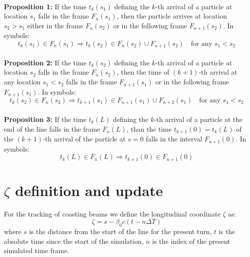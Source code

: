 ~\\
\textbf{Proposition 1:} If the time $t_k(s_1)$ defining the $k$-th arrival of a particle at location $s_1$ falls in the frame $F_n(s_1)$, then the particle arrives at location $s_2 > s_1$ either in the frame $F_n(s_2)$ or in the following frame $F_{n+1}(s_2)$. In symbols:
\begin{equation}
t_k(s_1) \in F_n(s_1) \Rightarrow t_k(s_2) \in F_n(s_2) \cup  F_{n+1}(s_2) \quad \text{for any } s_1 < s_2 
\end{equation}
~\\
\textbf{Proposition 2:} If the time $t_k(s_2)$ defining the $k$-th arrival of a particle at location $s_2$ falls in the frame $F_n(s_2)$, then the time of $(k+1)$-th arrival at any location $s_1 < s_2$ falls in the frame $F_{n+1}(s_1)$ or in the following frame $F_{n+1}(s_1)$. In symbols:
\begin{equation}
t_k(s_2) \in F_n(s_2) \Rightarrow t_{k+1}(s_1) \in F_{n+1}(s_1) \cup  F_{n+2}(s_1) \quad \text{for any } s_1 < s_2 
\end{equation}
~\\
\textbf{Proposition 3:} If the time $t_k(L)$ defining the $k$-th arrival of a particle at the end of the line falls in the frame $F_n(L)$, than the time $t_{k+1}(0) = t_k(L)$ of the $(k+1)$-th arrival of the particle at $s=0$ falls in the interval 
$F_{n+1}(0)$. In symbols:
\begin{equation}
t_k(L) \in F_n(L) \Rightarrow t_{k+1}(0) \in F_{n+1}(0)
\end{equation}

\section{$\zeta$ definition and update}

For the tracking of coasting beams we define the longitudinal coordinate $\zeta$ as:
\begin{equation}
\zeta = s  - \beta_0 c (t - n\Delta T)
\end{equation}
where $s$ is the distance from the start of the line for the present turn, $t$ is the absolute time since the start of the simulation, $n$ is the index of the present simulated time frame.

